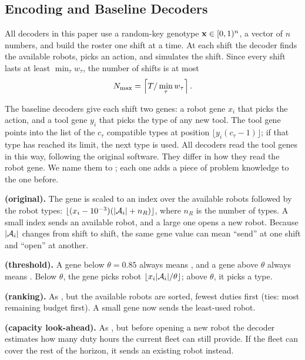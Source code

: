\documentclass[journal]{IEEEtran}
\begin{document}
\subsection{Encoding and Baseline Decoders}
\label{sec:problem:decoders}

All decoders in this paper use a random-key genotype $\mathbf{x} \in [0,1)^n$, a vector of $n$ numbers, and build the roster one shift at a time.
At each shift the decoder finds the available robots, picks an action, and simulates the shift.
Since every shift lasts at least $\min_\tau w_\tau$, the number of shifts is at most
\begin{equation}
  N_{\max} = \left\lceil T / \min_\tau w_\tau \right\rceil .
\end{equation}

The baseline decoders give each shift two genes: a robot gene $x_i$ that picks the action, and a tool gene $y_i$ that picks the type of any new tool.
The tool gene points into the list of the $c_\tau$ compatible types at position $\lfloor y_i (c_\tau - 1) \rfloor$;
if that type has reached its limit, the next type is used.
All decoders read the tool genes in this way, following the original software.
They differ in how they read the robot gene.
We name them  to ; each one adds a piece of problem knowledge to the one before.

\textbf{ (original).}
The gene is scaled to an index over the available robots followed by the robot types: $\lfloor (x_i - 10^{-3})(|\mathcal{A}_i| + n_R) \rfloor$, where $n_R$ is the number of types.
A small index sends an available robot, and a large one opens a new robot.
Because $|\mathcal{A}_i|$ changes from shift to shift, the same gene value can mean ``send'' at one shift and ``open'' at another.

\textbf{ (threshold).}
A gene below $\theta = 0.85$ always means \reuse, and a gene above $\theta$ always means \new.
Below $\theta$, the gene picks robot $\lfloor x_i |\mathcal{A}_i| / \theta \rfloor$; above $\theta$, it picks a type.

\textbf{ (ranking).}
As , but the available robots are sorted, fewest duties first (ties: most remaining budget first).
A small gene now sends the least-used robot.

\textbf{ (capacity look-ahead).}
As , but before opening a new robot the decoder estimates how many duty hours the current fleet can still provide.
If the fleet can cover the rest of the horizon, it sends an existing robot instead.
\end{document}
